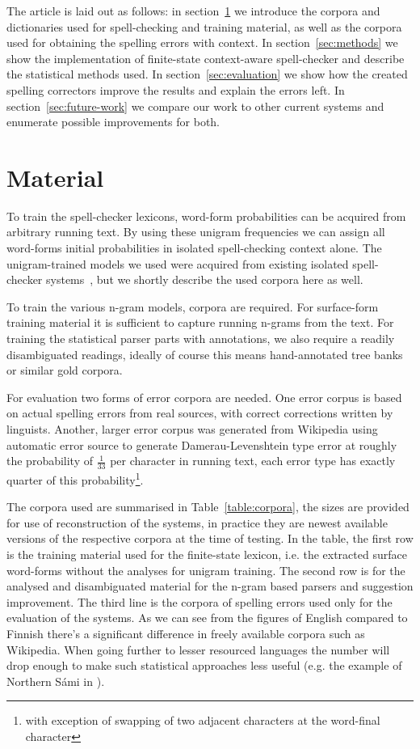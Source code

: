 \documentclass{llncs}
\begin{document}
The article is laid out as follows: in section~\ref{sec:material} we introduce
the corpora and dictionaries used for spell-checking and training material, as
well as the corpora used for obtaining the spelling errors with context. In
section~\ref{sec:methods} we show the implementation of finite-state
context-aware spell-checker and describe the statistical methods used. In
section~\ref{sec:evaluation} we show how the created spelling correctors
improve the results and explain the errors left. In
section~\ref{sec:future-work} we compare our work to other current systems and
enumerate possible improvements for both.

\section{Material}
\label{sec:material}

To train the spell-checker lexicons, word-form probabilities can be acquired
from arbitrary running text. By using these unigram frequencies we can assign
all word-forms initial probabilities in isolated spell-checking context alone.
The unigram-trained models we used were acquired from existing isolated
spell-checker systems~\cite{norvig/2010,pirinen/2010/lrec}, but we shortly
describe the used corpora here as well.

To train the various n-gram models, corpora are required. For surface-form
training material it is sufficient to capture running n-grams from the text.
For training the statistical parser parts with annotations, we also require a
readily disambiguated readings, ideally of course this means hand-annotated
tree banks or similar gold corpora. 

For evaluation two forms of error corpora are needed. One error corpus is based
on actual spelling errors from real sources, with correct corrections
written by linguists. Another, larger error corpus was generated from Wikipedia
using automatic error source to generate Damerau-Levenshtein type error at
roughly the probability of $\frac{1}{33}$ per character in running text, each
error type has exactly quarter of this probability\footnote{with exception of
swapping of two adjacent characters at the word-final character}. 

The corpora used are summarised in Table~\ref{table:corpora}, the sizes are
provided for use of reconstruction of the systems, in practice they are newest
available versions of the respective corpora at the time of testing. In the
table, the first row is the training material used for the finite-state
lexicon, i.e. the extracted surface word-forms without the analyses for unigram
training. The second row is for the analysed and disambiguated material for the
n-gram based parsers and suggestion improvement. The third line is the corpora
of spelling errors used only for the evaluation of the systems.  As we can see
from the figures of English compared to Finnish there's a significant
difference in freely available corpora such as Wikipedia. When going further to
lesser resourced languages the number will drop enough to make such statistical
approaches less useful (e.g. the example of Northern S\'{a}mi in
\cite{pirinen/2010/lrec}).
\end{document}

